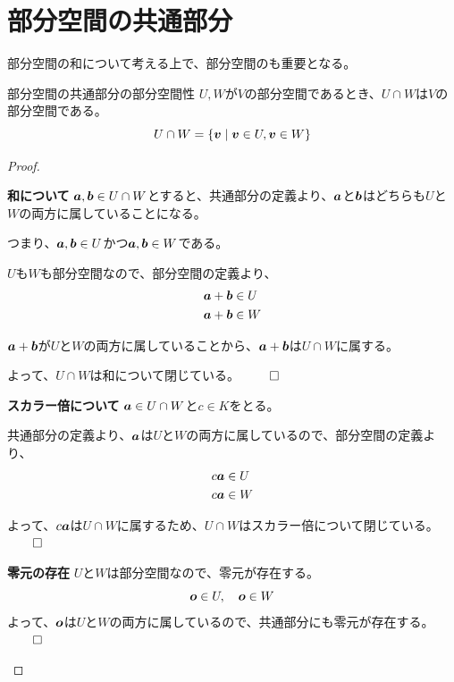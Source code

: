 \documentclass[../../../topic_linear-algebra]{subfiles}
\begin{document}
\sectionline
\section{部分空間の共通部分}

部分空間の和について考える上で、部分空間のも重要となる。

\begin{theorem*}{部分空間の共通部分の部分空間性}
  $U,W$が$V$の部分空間であるとき、$U \cap W$は$V$の部分空間である。
  \begin{equation*}
    U \cap W = \{ \vb*{v} \mid \vb*{v} \in U, \vb*{v} \in W \}
  \end{equation*}
\end{theorem*}

\begin{proof}
  \begin{subpattern}{\bfseries 和について}
    $\vb*{a}, \vb*{b} \in U \cap W$とすると、共通部分の定義より、$\vb*{a}$と$\vb*{b}$はどちらも$U$と$W$の両方に属していることになる。

    つまり、$\vb*{a}, \vb*{b} \in U$かつ$\vb*{a}, \vb*{b} \in W$である。

    \br

    $U$も$W$も部分空間なので、部分空間の定義より、
    \begin{align*}
      \vb*{a} + \vb*{b} & \in U \\
      \vb*{a} + \vb*{b} & \in W
    \end{align*}

    $\vb*{a} + \vb*{b}$が$U$と$W$の両方に属していることから、$\vb*{a} + \vb*{b}$は$U \cap W$に属する。

    よって、$U \cap W$は和について閉じている。 $\qed$
  \end{subpattern}

  \begin{subpattern}{\bfseries スカラー倍について}
    $\vb*{a} \in U \cap W$と$c \in K$をとる。

    共通部分の定義より、$\vb*{a}$は$U$と$W$の両方に属しているので、部分空間の定義より、
    \begin{align*}
      c \vb*{a} & \in U \\
      c \vb*{a} & \in W
    \end{align*}

    よって、$c \vb*{a}$は$U \cap W$に属するため、$U \cap W$はスカラー倍について閉じている。 $\qed$
  \end{subpattern}
  
  \begin{subpattern}{\bfseries 零元の存在}
    $U$と$W$は部分空間なので、零元が存在する。
    \begin{equation*}
      \vb*{o} \in U, \quad \vb*{o} \in W
    \end{equation*}
    よって、$\vb*{o}$は$U$と$W$の両方に属しているので、共通部分にも零元が存在する。 $\qed$
  \end{subpattern}
\end{proof}
\end{document}

